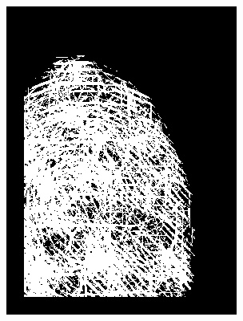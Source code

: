 \documentclass{beamer}
\begin{document}
{\begin{figure}[!ht]
\begin{subfigure}[ht]{0.15\textwidth}
            \includegraphics[width=\textwidth]{fingerprints/2004Db4a/1_1_mask.jpg}
        \end{subfigure}
        \qquad
        \begin{subfigure}[ht]{0.15\textwidth}

\end{subfigure}
\end{figure}}
\end{document}
